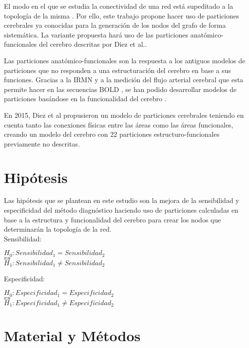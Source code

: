 \documentclass[fleqn,12pt]{UICArticle} %
\begin{document}
El modo en el que se estudia la conectividad de una red está supeditado a la topología de la misma \cite{Fornito, Zalesky2010}. Por ello, este trabajo propone hacer uso de particiones cerebrales ya conocidas para la generación de los nodos del grafo de forma sistemática. La variante propuesta hará uso de las particiones anatómico-funcionales del cerebro descritas por Diez et al.\cite{Diez2015}.

Las particiones anatómico-funcionales son la respuesta a los antiguos modelos de particiones que no responden a una estructuración del cerebro en base a sus funciones. Gracias a la IRMN y a la medición del flujo arterial cerebral que esta permite hacer en las secuencias BOLD \cite{Ogawa1990}, se han podido desarrollar modelos de particiones basándose en la funcionalidad del cerebro \cite{Heller2006}.

En 2015, Diez et al \cite{Diez2015} propusieron un modelo de particiones cerebrales teniendo en cuenta tanto las conexiones físicas entre las áreas como las áreas funcionales, creando un modelo del cerebro con 22 particiones estructuro-funcionales previamente no descritas. 


\section{Hipótesis}

Las hipótesis que se plantean en este estudio son la mejora de la sensibilidad y especificidad del método diagnóstico haciendo uso de particiones calculadas en base a la estructura y funcionalidad del cerebro para crear los nodos que determinarán la topología de la red. 
\vspace{1em} \\
Sensibilidad:
\begin{center}
$H_0: Sensibilidad_1 = Sensibilidad_2$ \\
$vs$ \\
$H_1: Sensibilidad_1 \neq Sensibilidad_2$
\end{center}
Especificidad:
\begin{center}
$H_0: Especificidad_1 = Especificidad_2$ \\
$vs$ \\
$H_1: Especificidad_1 \neq Especificidad_2$
\end{center}

\section{Material y Métodos}
\end{document}
